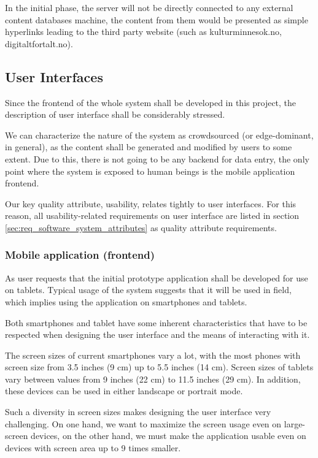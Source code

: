 \documentclass[11pt]{book}
\begin{document}
In the initial phase, the server will not be directly connected to any external content databases machine, the content from them would be presented as simple hyperlinks leading to the third party website (such as kulturminnesok.no, digitaltfortalt.no).

\subsection{User Interfaces}
Since the frontend of the whole system shall be developed in this project, the description of user interface shall be considerably stressed.

We can characterize the nature of the system as crowdsourced (or edge-dominant, in general), as the content shall be generated and modified by users to some extent. Due to this, there is not going to be any backend for data entry, the only point where the system is exposed to human beings is the mobile application frontend.

Our key quality attribute, usability, relates tightly to user interfaces. For this reason, all usability-related requirements on user interface are listed in section \ref{sec:req_software_system_attributes} as quality attribute requirements.

\subsubsection{Mobile application (frontend)}\label{sec:req_webapplication_frontend}
As user requests that the initial prototype application shall be developed for use on tablets. Typical usage of the system suggests that it will be used in field, which implies using the application on smartphones and tablets.

Both smartphones and tablet have some inherent characteristics that have to be respected when designing the user interface and the means of interacting with it.

The screen sizes of current smartphones vary a lot, with the most phones with screen size from 3.5 inches (9 cm) up to 5.5 inches (14 cm). Screen sizes of tablets vary between values from 9 inches (22 cm) to 11.5 inches (29 cm). In addition, these devices can be used in either landscape or portrait mode.

Such a diversity in screen sizes makes designing the user interface very challenging. On one hand, we want to maximize the screen usage even on large-screen devices, on the other hand, we must make the application usable even on devices with screen area up to 9 times smaller.
\end{document}
